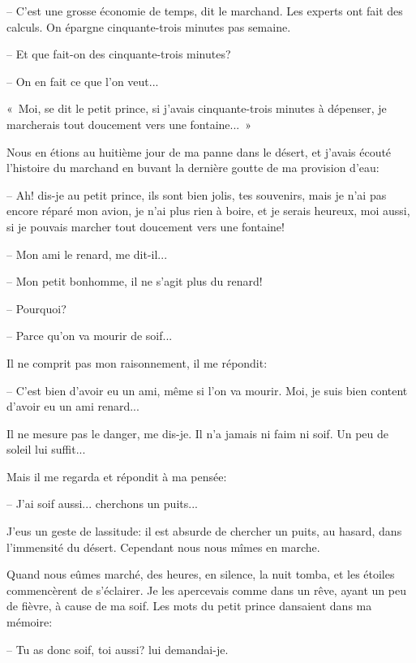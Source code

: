 \documentclass[a4paper]{report}
\begin{document}
-- C'est une grosse économie de temps, dit le marchand. Les experts ont fait des calculs. On épargne cinquante-trois minutes pas semaine.

-- Et que fait-on des cinquante-trois minutes?

-- On en fait ce que l'on veut...

«~Moi, se dit le petit prince, si j'avais cinquante-trois minutes à dépenser, je marcherais tout doucement vers une fontaine...~»


\parachapter{} %
Nous en étions au huitième jour de ma panne dans le désert, et j'avais écouté l'histoire du marchand en buvant la dernière goutte de ma provision d'eau:

-- Ah! dis-je au petit prince, ils sont bien jolis, tes souvenirs, mais je n'ai pas encore réparé mon avion, je n'ai plus rien à boire, et je serais heureux, moi aussi, si je pouvais marcher tout doucement vers une fontaine!

-- Mon ami le renard, me dit-il...

-- Mon petit bonhomme, il ne s'agit plus du renard!

-- Pourquoi?

-- Parce qu'on va mourir de soif...

Il ne comprit pas mon raisonnement, il me répondit:

-- C'est bien d'avoir eu un ami, même si l'on va mourir. Moi, je suis bien content d'avoir eu un ami renard...

Il ne mesure pas le danger, me dis-je. Il n'a jamais ni faim ni soif. Un peu de soleil lui suffit...

Mais il me regarda et répondit à ma pensée:

-- J'ai soif aussi... cherchons un puits...

J'eus un geste de lassitude: il est absurde de chercher un puits, au hasard, dans l'immensité du désert. Cependant nous nous mîmes\ft[metre]{}{} en marche.

Quand nous eûmes marché, des heures, en silence, la nuit tomba, et les étoiles commencèrent de s'éclairer. Je les apercevais comme dans un rêve, ayant un peu de fièvre, à cause de ma soif. Les mots du petit prince dansaient dans ma mémoire:

-- Tu as donc soif, toi aussi? lui demandai-je.
\end{document}
